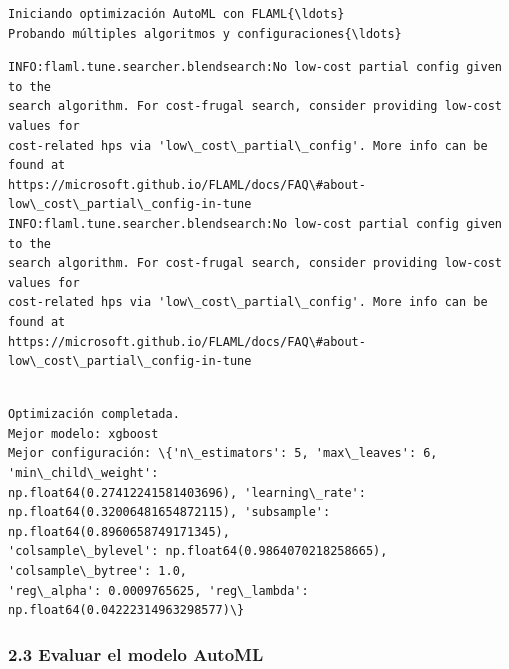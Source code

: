 \documentclass[11pt]{article}
\begin{document}
    \begin{Verbatim}[commandchars=\\\{\}]
Iniciando optimización AutoML con FLAML{\ldots}
Probando múltiples algoritmos y configuraciones{\ldots}
    \end{Verbatim}

    \begin{Verbatim}[commandchars=\\\{\}]
INFO:flaml.tune.searcher.blendsearch:No low-cost partial config given to the
search algorithm. For cost-frugal search, consider providing low-cost values for
cost-related hps via 'low\_cost\_partial\_config'. More info can be found at
https://microsoft.github.io/FLAML/docs/FAQ\#about-low\_cost\_partial\_config-in-tune
INFO:flaml.tune.searcher.blendsearch:No low-cost partial config given to the
search algorithm. For cost-frugal search, consider providing low-cost values for
cost-related hps via 'low\_cost\_partial\_config'. More info can be found at
https://microsoft.github.io/FLAML/docs/FAQ\#about-low\_cost\_partial\_config-in-tune
    \end{Verbatim}

    \begin{Verbatim}[commandchars=\\\{\}]

Optimización completada.
Mejor modelo: xgboost
Mejor configuración: \{'n\_estimators': 5, 'max\_leaves': 6, 'min\_child\_weight':
np.float64(0.27412241581403696), 'learning\_rate':
np.float64(0.32006481654872115), 'subsample': np.float64(0.8960658749171345),
'colsample\_bylevel': np.float64(0.9864070218258665), 'colsample\_bytree': 1.0,
'reg\_alpha': 0.0009765625, 'reg\_lambda': np.float64(0.04222314963298577)\}
    \end{Verbatim}

    \subsubsection{2.3 Evaluar el modelo
AutoML}\label{evaluar-el-modelo-automl}
\end{document}
